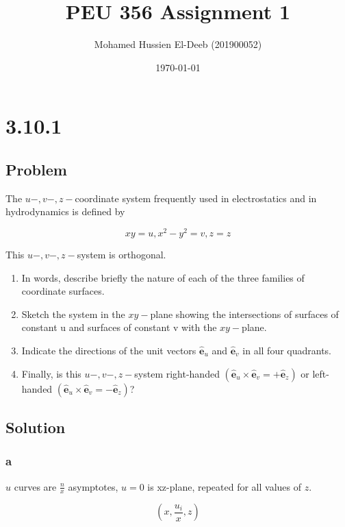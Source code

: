 \documentclass[12pt]{article}
\title{PEU 356 Assignment 1}
\author{Mohamed Hussien El-Deeb (201900052)}
\date{\today}
\begin{document}
\maketitle
\tableofcontents

\section{3.10.1}

\subsection{Problem}

The \(u-, v-, z-\)coordinate system frequently used in electrostatics and in hydrodynamics
is defined by

\[
    xy = u, x^2 - y^2 = v, z = z
\]

This \(u-, v-, z-\)system is orthogonal.
\bigskip

\begin{enumerate}[label= \textbf{(\alph*)}]
    \item In words, describe briefly the nature of each of the three families of coordinate
          surfaces.
    \item Sketch the system in the \(x y-\)plane showing the intersections of surfaces of constant
          u and surfaces of constant v with the \(x y-\)plane.
    \item Indicate the directions of the unit vectors \(\hat{\mathbf{e}}_u\) and \(\hat{\mathbf{e}}_v\)
          in all four quadrants.
    \item Finally, is this \(u-, v-, z-\)system right-handed \((\hat{\mathbf{e}}_u \times \hat{\mathbf{e}}_v
          = +\hat{\mathbf{e}}_z )\) or left-handed \((\hat{\mathbf{e}}_u \times
          \hat{\mathbf{e}}_v = -\hat{\mathbf{e}}_z )\)?
\end{enumerate}

\subsection{Solution}

\subsubsection{a}

\(u\) curves are \(\frac{n}{x}\) asymptotes, \(u=0\) is xz-plane, repeated for all values of \(z\).

\[
    (x, \frac{u_i}{x}, z)
\]
\end{document}
